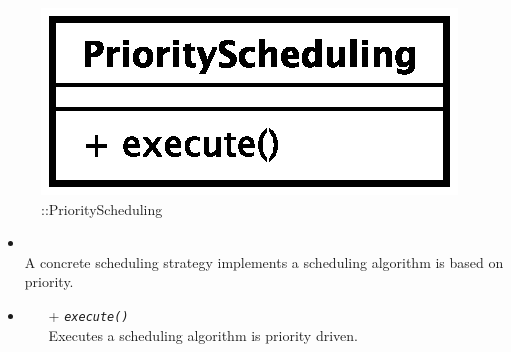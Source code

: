 \begin{figure}[h]
\centering
\includegraphics[scale=0.6,keepaspectratio]{images/solution/priority_scheduling.eps}
\caption{\pScheduling::PriorityScheduling}
\label{fig:sd-app-scheduling-priority-scheduling}
\end{figure}
\FloatBarrier
\begin{itemize}
  \item \textbf{\descr} \\
    A concrete scheduling strategy implements a scheduling algorithm is based on priority.
  \item \textbf{\ops}
     \begin{itemize}
    \item[+] \texttt{\textit{execute()}} \\
Executes a scheduling algorithm is priority driven.
  \end{itemize}
\end{itemize}
